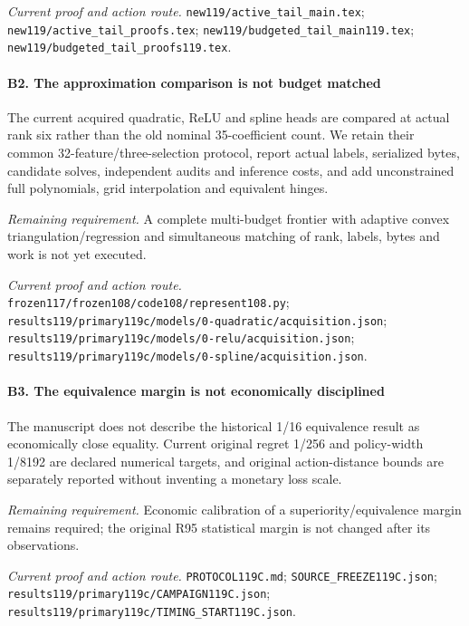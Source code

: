 \par\emph{Current proof and action route.} \nolinkurl{new119/active_tail_main.tex}; \nolinkurl{new119/active_tail_proofs.tex}; \nolinkurl{new119/budgeted_tail_main119.tex}; \nolinkurl{new119/budgeted_tail_proofs119.tex}.

\paragraph{B2. The approximation comparison is not budget matched}

The current acquired quadratic, ReLU and spline heads are compared at actual rank six rather than the old nominal 35-coefficient count. We retain their common 32-feature/\allowbreak{}three-selection protocol, report actual labels, serialized bytes, candidate solves, independent audits and inference costs, and add unconstrained full polynomials, grid interpolation and equivalent hinges.

\par\emph{Remaining requirement.} A complete multi-budget frontier with adaptive convex triangulation/\allowbreak{}regression and simultaneous matching of rank, labels, bytes and work is not yet executed.

\par\emph{Current proof and action route.} \nolinkurl{frozen117/frozen108/code108/represent108.py}; \nolinkurl{results119/primary119c/models/0-quadratic/acquisition.json}; \nolinkurl{results119/primary119c/models/0-relu/acquisition.json}; \nolinkurl{results119/primary119c/models/0-spline/acquisition.json}.

\paragraph{B3. The equivalence margin is not economically disciplined}

The manuscript does not describe the historical 1/16 equivalence result as economically close equality. Current original regret 1/256 and policy-width 1/8192 are declared numerical targets, and original action-distance bounds are separately reported without inventing a monetary loss scale.

\par\emph{Remaining requirement.} Economic calibration of a superiority/\allowbreak{}equivalence margin remains required; the original R95 statistical margin is not changed after its observations.

\par\emph{Current proof and action route.} \nolinkurl{PROTOCOL119C.md}; \nolinkurl{SOURCE_FREEZE119C.json}; \nolinkurl{results119/primary119c/CAMPAIGN119C.json}; \nolinkurl{results119/primary119c/TIMING_START119C.json}.

